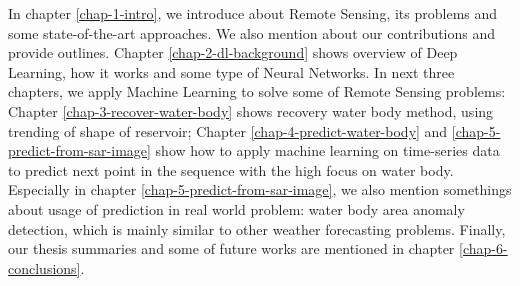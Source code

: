 In chapter \ref{chap-1-intro}, we introduce about Remote Sensing, its problems and some state-of-the-art approaches. We also mention about our contributions and provide outlines. Chapter \ref{chap-2-dl-background} shows overview of Deep Learning, how it works and some type of Neural Networks. In next three chapters, we apply Machine Learning to solve some of Remote Sensing problems: Chapter \ref{chap-3-recover-water-body} shows recovery water body method, using trending of shape of reservoir; Chapter \ref{chap-4-predict-water-body} and \ref{chap-5-predict-from-sar-image} show how to apply machine learning on time-series data to predict next point in the sequence with the high focus on water body. Especially in chapter \ref{chap-5-predict-from-sar-image}, we also mention somethings about usage of prediction in real world problem: water body area anomaly detection, which is mainly similar to other weather forecasting problems. Finally, our thesis summaries and some of future works are mentioned in chapter \ref{chap-6-conclusions}. 
